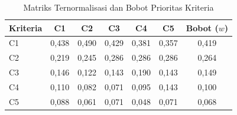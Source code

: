 \begin{table}[h]
\centering
\caption{Matriks Ternormalisasi dan Bobot Prioritas Kriteria}
\label{tab:ahp-bobot-kriteria}
\begin{tabular}{|l|c|c|c|c|c|c|}
\hline
\textbf{Kriteria} & \textbf{C1} & \textbf{C2} & \textbf{C3} & \textbf{C4} & \textbf{C5} & \textbf{Bobot ($w$)} \\
\hline
C1 & 0,438 & 0,490 & 0,429 & 0,381 & 0,357 & 0,419 \\
C2 & 0,219 & 0,245 & 0,286 & 0,286 & 0,286 & 0,264 \\
C3 & 0,146 & 0,122 & 0,143 & 0,190 & 0,143 & 0,149 \\
C4 & 0,110 & 0,082 & 0,071 & 0,095 & 0,143 & 0,100 \\
C5 & 0,088 & 0,061 & 0,071 & 0,048 & 0,071 & 0,068 \\
\hline
\end{tabular}
\end{table}
